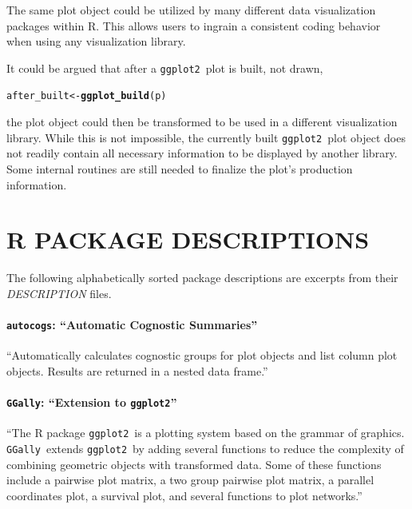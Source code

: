 \documentclass[stat,dissertation]{puthesis}\usepackage[]{graphicx}\usepackage{xcolor}
\makeatletter
\newcommand{\hlstd}[1]{\textcolor[rgb]{0.345,0.345,0.345}{#1}}%
\newcommand{\hlkwb}[1]{\textcolor[rgb]{0.69,0.353,0.396}{#1}}%
\newcommand{\hlkwd}[1]{\textcolor[rgb]{0.737,0.353,0.396}{\textbf{#1}}}%
\newenvironment{kframe}{%
 \def\at@end@of@kframe{}%
 \ifinner\ifhmode%
  \def\at@end@of@kframe{\end{minipage}}%
  \begin{minipage}{\columnwidth}%
 \fi\fi%
 \def\FrameCommand##1{\hskip\@totalleftmargin \hskip-\fboxsep
 \colorbox{shadecolor}{##1}\hskip-\fboxsep
     \hskip-\linewidth \hskip-\@totalleftmargin \hskip\columnwidth}%
 \MakeFramed {\advance\hsize-\width
   \@totalleftmargin\z@ \linewidth\hsize
   \@setminipage}}%
 {\par\unskip\endMakeFramed%
 \at@end@of@kframe}
\newenvironment{knitrout}{}{} %
\renewenvironment{knitrout}{\setstretch{1}}{}
\newcommand{\pkg}[1]{\texttt{#1}}
\newcommand{\ggplot}{\pkg{ggplot2}}
\newcommand{\autocogs}{\pkg{autocogs}}
\newcommand{\GGally}{\pkg{GGally}}
\makeatother
\begin{document}
The same plot object could be utilized by many different data visualization packages within R.  This allows users to ingrain a consistent coding behavior when using any visualization library.

It could be argued that after a \ggplot~plot is built, not drawn,
\begin{knitrout}\small
{}\color{fgcolor}\begin{kframe}
\begin{alltt}
\hlstd{after_built} \hlkwb{<-} \hlkwd{ggplot_build}\hlstd{(p)}
\end{alltt}
\end{kframe}
\end{knitrout}
\noindent the plot object could then be transformed to be used in a different visualization library.  While this is not impossible, the currently built \ggplot~plot object does not readily contain all necessary information to be displayed by another library.  Some internal routines are still needed to finalize the plot's production information.



\appendices



\chapter{R PACKAGE DESCRIPTIONS} \label{chapter:pkgs}

  The following alphabetically sorted package descriptions are excerpts from their \emph{DESCRIPTION} files.


\subsubsection{\autocogs: ``Automatic Cognostic Summaries''}

``Automatically calculates cognostic groups for plot objects and list column plot objects.  Results are returned in a nested data frame.''~\cite{github_autocogs}


\subsubsection{\GGally: ``Extension to \ggplot''}
  ``The R package \ggplot~is a plotting system based on the grammar of graphics. \GGally~extends \ggplot~by adding several functions to reduce the complexity of combining geometric objects with transformed data. Some of these functions include a pairwise plot matrix, a two group pairwise plot matrix, a parallel coordinates plot, a survival plot, and several functions to plot networks.''~\cite{r_ggally}~\cite{github_ggally}
\end{document}
